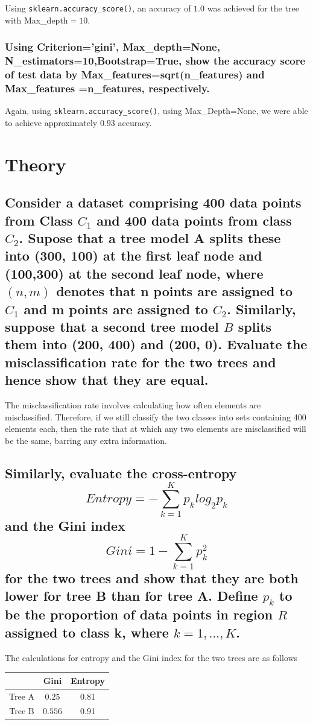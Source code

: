 \documentclass{article}
\begin{document}
			Using \texttt{sklearn.accuracy\_score()}, an accuracy of $1.0$ was achieved for the tree
			with Max\_depth$=10$.

			\subsubsection{Using Criterion='gini', Max\_depth=None, N\_estimators=10,Bootstrap=True,
			show the accuracy score of test data by Max\_features=sqrt(n\_features) and Max\_features
			=n\_features, respectively.}

			Again, using \texttt{sklearn.accuracy\_score()}, using Max\_Depth=None, we were able to 
			achieve approximately $0.93$ accuracy.
\section{Theory}
	\subsection{Consider a dataset comprising 400 data points from Class $C_{1}$ and 400 data points 
		from class $C_{2}$. Supose that a tree model A splits these into (300, 100) at the first leaf
		node and (100,300) at the second leaf node, where $(n,m)$ denotes that n points are assigned 
		to $C_{1}$ and m points are assigned to $C_{2}$. Similarly, suppose that a second tree model $B$
		splits them into (200, 400) and (200, 0). Evaluate the misclassification rate for the two trees
		and hence show that they are equal.}
		
		The misclassification rate involves calculating how often elements are misclassified. Therefore, 
		if we still classify the two classes into sets containing 400 elements each, then the rate that
		at which any two elements are misclassified will be the same, barring any extra information.
	\subsection{Similarly, evaluate the cross-entropy 
		\[ Entropy = - \sum_{k = 1}^{K}p_{k}log_{2}p_{k}\]
		and the Gini index
		\[ Gini = 1 - \sum_{k = 1}^{K}p^{2}_{k}\]
		for the two trees and show that they are both lower for tree B than for tree A. Define $p_{k}$
		to be the proportion of data points in region $R$ assigned to class k, where $k = 1,...,K$.
		}
		The calculations for entropy and the Gini index for the two trees are as follows

		\begin{center}
		\begin{tabular}{|c | c | c |}
			\hline
			 & Gini & Entropy\\\hline
			Tree A & $0.25$ & 0.81\\\hline
			Tree B & $0.556$ & 0.91 \\\hline
		\end{tabular}
		\end{center}
\end{document}
